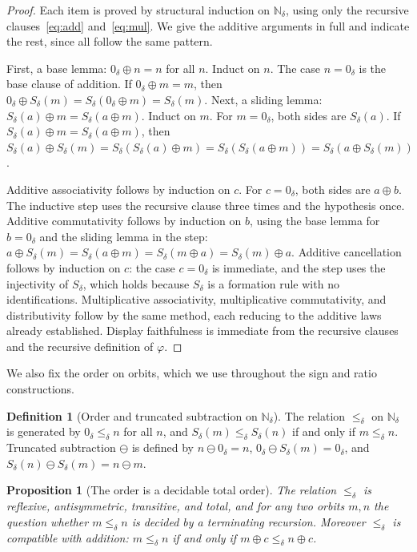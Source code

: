 \documentclass[11pt,a4paper]{article}
\newtheorem{proposition}[theorem]{Proposition}
\theoremstyle{definition}
\newtheorem{definition}[theorem]{Definition}
\theoremstyle{remark}
\newcommand{\Nd}{\mathbb{N}_\delta}
\newcommand{\Sd}{S_\delta}
\newcommand{\zd}{0_\delta}
\newcommand{\oad}{\oplus}
\begin{document}
\begin{proof}
Each item is proved by structural induction on $\Nd$, using only the recursive
clauses~\eqref{eq:add} and~\eqref{eq:mul}. We give the additive arguments in
full and indicate the rest, since all follow the same pattern.

First, a base lemma: $\zd \oad n = n$ for all $n$. Induct on $n$. The case
$n = \zd$ is the base clause of addition. If $\zd \oad m = m$, then
$\zd \oad \Sd(m) = \Sd(\zd \oad m) = \Sd(m)$. Next, a sliding lemma:
$\Sd(a) \oad m = \Sd(a \oad m)$. Induct on $m$. For $m = \zd$, both sides are
$\Sd(a)$. If $\Sd(a) \oad m = \Sd(a \oad m)$, then
$\Sd(a) \oad \Sd(m) = \Sd(\Sd(a) \oad m) = \Sd(\Sd(a \oad m)) = \Sd(a \oad \Sd(m))$.

Additive associativity follows by induction on $c$. For $c = \zd$, both sides
are $a \oad b$. The inductive step uses the recursive clause three times and the
hypothesis once. Additive commutativity follows by induction on $b$, using the
base lemma for $b = \zd$ and the sliding lemma in the step:
$a \oad \Sd(m) = \Sd(a \oad m) = \Sd(m \oad a) = \Sd(m) \oad a$. Additive
cancellation follows by induction on $c$: the case $c = \zd$ is immediate, and
the step uses the injectivity of $\Sd$, which holds because $\Sd$ is a formation
rule with no identifications. Multiplicative associativity, multiplicative
commutativity, and distributivity follow by the same method, each reducing to
the additive laws already established. Display faithfulness is immediate from
the recursive clauses and the recursive definition of $\varphi$.
\end{proof}

We also fix the order on orbits, which we use throughout the sign and ratio
constructions.

\begin{definition}[Order and truncated subtraction on $\Nd$]\label{def:order}
The relation $\leq_\delta$ on $\Nd$ is generated by $\zd \leq_\delta n$ for all
$n$, and $\Sd(m) \leq_\delta \Sd(n)$ if and only if $m \leq_\delta n$. Truncated
subtraction $\ominus$ is defined by $n \ominus \zd = n$,
$\zd \ominus \Sd(m) = \zd$, and $\Sd(n) \ominus \Sd(m) = n \ominus m$.
\end{definition}

\begin{proposition}[The order is a decidable total order]\label{prop:order}
The relation $\leq_\delta$ is reflexive, antisymmetric, transitive, and total,
and for any two orbits $m, n$ the question whether $m \leq_\delta n$ is decided
by a terminating recursion. Moreover $\leq_\delta$ is compatible with addition:
$m \leq_\delta n$ if and only if $m \oad c \leq_\delta n \oad c$.
\end{proposition}
\end{document}

